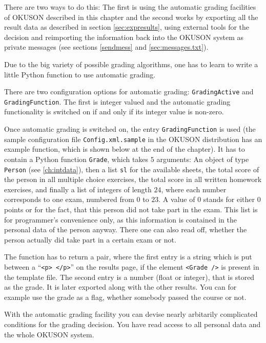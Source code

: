 \documentclass[12pt,openany,a4paper]{book}
\newcommand{\OKUSON}{\textsf{OKUSON}}
\begin{document}
There are two ways to do this: The first is using the automatic grading
facilities of {\OKUSON} described in this chapter and the second works
by exporting all the result data as described in section
\ref{sec:expresults}, using external tools for the decision and reimporting
the information back into the {\OKUSON} system as private messages
(see sections \ref{sendmess} and \ref{sec:messages.txt}).

Due to the big variety of possible grading algorithms, one has to learn
to write a little Python function to use automatic grading.

There are two configuration options for automatic grading:
\texttt{GradingActive} and \texttt{Grading\-Function}. The first is integer
valued and the automatic grading functionality is switched on if and only if
its integer value is non-zero.

Once automatic grading is switched on, the entry
\texttt{GradingFunction} is used (the sample configuration file
\texttt{Config.xml.sample} in the {\OKUSON} distribution has an example
function, which is shown below at the end of the chapter). It has to
contain a Python function \texttt{Grade}, which takes $5$ arguments:
An object of type \texttt{Person} (see \ref{ch:intdata}), then a list
\texttt{sl} for the available sheets, the total score of the person in
all multiple choice exercises, the total score in all written homework
exercises, and finally a list of integers of length $24$, where each
number corresponds to one exam, numbered from $0$ to $23$. A value of
$0$ stands for either $0$ points or for the fact, that this person did
not take part in the exam. This list is for programmer's convenience
only, as this information is contained in the personal data of the
person anyway. There one can also read off, whether the person actually
did take part in a certain exam or not.

The function has to return a pair, where the first entry is a string which
is put between a ``\texttt{<p> </p>}'' on the results page, if the
element \texttt{<Grade />} is present in the template file. The second
entry is a number (float or integer), that is stored as the grade.
It is later exported along with the other results. You can for example use
the grade as a flag, whether somebody passed the course or not.

With the automatic grading facility you can devise nearly arbitarily 
complicated conditions for the grading decision. You have read access to
all personal data and the whole {\OKUSON} system.
\end{document}

